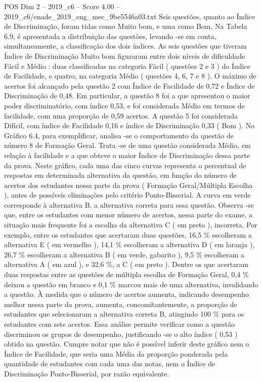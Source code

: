 \begin{textsample}{POS Dim 2 – 2019\_c6 – Score 4.00 – 2019\_c6/enade\_2019\_eng\_mec\_9be5546a03.txt}
Seis questões, quanto ao Índice de Discriminação, foram tidas como Muito bom, e uma como Bom.
Na Tabela 6.9, é apresentada a distribuição das questões, levando -se em conta, simultaneamente, a classificação dos dois índices.
As seis questões que tiveram Índice de Discriminação Muito bom figuraram entre dois níveis de dificuldade Fácil e Médio : duas classificadas na categoria Fácil ( questões 2 e 3 ) do Índice de Facilidade, e quatro, na categoria Médio ( questões 4, 6, 7 e 8 ).
O máximo de acertos foi alcançado pela questão 2 com Índice de Facilidade de 0,72 e Índice de Discriminação de 0,48.
Em particular, a questão 8 foi a que apresentou o maior poder discriminatório, com índice 0,53, e foi considerada Médio em termos de facilidade, com uma proporção de 0,59 acertos.
A questão 5 foi considerada Difícil, com índice de Facilidade 0,16 e índice de Discriminação 0,33 ( Bom ).
No Gráfico 6.4, para exemplificar, analisa -se o comportamento da questão de número 8 de Formação Geral.
Trata -se de uma questão considerada Médio, em relação à facilidade e a que obteve o maior Índice de Discriminação dessa parte da prova.
Neste gráfico, cada uma das cinco curvas representa o percentual de respostas em determinada alternativa da questão, em função do número de acertos dos estudantes nessa parte da prova ( Formação Geral/Múltipla Escolha ), antes de possíveis eliminações pelo critério Ponto-Bisserial.
A curva em verde corresponde à alternativa B, a alternativa correta para essa questão.
Observa -se que, entre os estudantes com menor número de acertos, nessa parte do exame, a situação mais frequente foi a escolha da alternativa C ( em preto ), incorreta.
Por exemplo, entre os estudantes que acertaram duas questões, 16,5 \% escolheram a alternativa E ( em vermelho ), 14,1 \% escolheram a alternativa D ( em laranja ), 26,7 \% escolheram a alternativa B ( em verde, gabarito ), 9,5 \% escolheram a alternativa A ( em azul ), e 32,6 \%, a C ( em preto ).
Dentre os que acertaram duas respostas entre as questões de múltipla escolha de Formação Geral, 0,4 \% deixou a questão em branco e 0,1 \% marcou mais de uma alternativa, invalidando a questão.
À medida que o número de acertos aumenta, indicando desempenho melhor nessa parte da prova, aumenta, concomitantemente, a proporção de estudantes que selecionaram a alternativa correta B, atingindo 100 \% para os estudantes com sete acertos.
Essa análise permite verificar como a questão discriminou os grupos de desempenho, justificando -se o alto índice ( 0,53 ) obtido na questão.
Cumpre notar que não é possível inferir deste gráfico nem o Índice de Facilidade, que seria uma Média da proporção ponderada pela quantidade de estudantes com cada uma das notas, nem o Índice de Discriminação Ponto-Bisserial, por razão equivalente.

\end{textsample}

